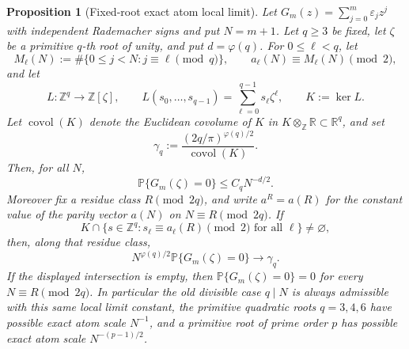 \documentclass[11pt]{amsart}
\numberwithin{equation}{section}
\newtheorem{proposition}[theorem]{Proposition}
\theoremstyle{definition}
\theoremstyle{remark}
\newcommand{\Prob}{\mathbb P}
\begin{document}
\begin{proposition}[Fixed-root exact atom local limit]
\label{prop:rademacher-small-denom-lower}
Let \(G_m(z)=\sum_{j=0}^m\varepsilon_jz^j\) with independent Rademacher signs
and put \(N=m+1\).  Let \(q\ge3\) be fixed, let \(\zeta\) be a primitive
\(q\)-th root of unity, and put \(d=\varphi(q)\).  For
\(0\le\ell<q\), let
\[
  M_\ell(N):=\#\{0\le j<N:j\equiv\ell\pmod q\},
  \qquad
  a_\ell(N)\equiv M_\ell(N)\pmod2,
\]
and let
\[
  L:\mathbb Z^q\to\mathbb Z[\zeta],\qquad
  L(s_0,\ldots,s_{q-1})=\sum_{\ell=0}^{q-1}s_\ell\zeta^\ell,
  \qquad K:=\ker L .
\]
Let \(\operatorname{covol}(K)\) denote the Euclidean covolume of \(K\) in
\(K\otimes_{\mathbb Z}\mathbb R\subset\mathbb R^q\), and set
\[
  \gamma_q:=\frac{(2q/\pi)^{\varphi(q)/2}}{\operatorname{covol}(K)}.
\]
Then, for all \(N\),
\[
  \Prob\{G_m(\zeta)=0\}\le C_q N^{-d/2}.
\]
Moreover fix a residue class \(R\pmod {2q}\), and write \(a^R=a(R)\) for the
constant value of the parity vector \(a(N)\) on \(N\equiv R\pmod {2q}\).  If
\[
  K\cap\{s\in\mathbb Z^q:s_\ell\equiv a_\ell(R)\pmod2
       \text{ for all }\ell\}\ne\varnothing ,
\]
then, along that residue class,
\[
  N^{\varphi(q)/2}\Prob\{G_m(\zeta)=0\}\longrightarrow \gamma_q .
\]
If the displayed intersection is empty, then
\(\Prob\{G_m(\zeta)=0\}=0\) for every \(N\equiv R\pmod {2q}\).  In particular
the old divisible case \(q\mid N\) is always admissible with this same local
limit constant, the primitive quadratic roots \(q=3,4,6\) have possible exact
atom scale \(N^{-1}\), and a primitive root of prime order \(p\) has possible
exact atom scale \(N^{-(p-1)/2}\).
\end{proposition}
\end{document}
